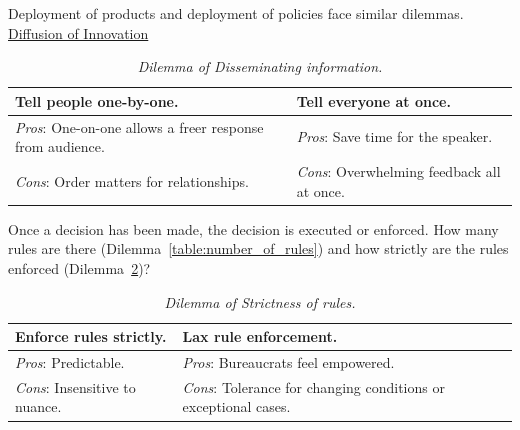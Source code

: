 Deployment of products and deployment of policies face similar dilemmas. \href{https://en.wikipedia.org/wiki/Diffusion_of_innovations}{Diffusion of Innovation}

\begin{center}
\begin{table}[H] %
\begin{tabular}{ | m{\dilemmatablewidth}| m{\dilemmatablewidth} | } 
  \hline
  \textbf{Tell people one-by-one.} & 
  \textbf{Tell everyone at once.} \\ 
  \hline
  \textit{Pros}: One-on-one allows a freer response from audience. &
  \textit{Pros}: Save time for the speaker. \\
  \hline
  \textit{Cons}: Order matters for relationships. & 
  \textit{Cons}: Overwhelming feedback all at once. \\  
  \hline
\end{tabular}
\caption{\textit{Dilemma of Disseminating information.}
}
\label{table:disseminate_one-by-one}
\end{table}
\end{center}

Once a decision has been made, the decision is executed or enforced. How many rules are there (Dilemma~\ref{table:number_of_rules}) and
how strictly are the rules enforced (Dilemma~\ref{table:rule_strictness})?

\begin{center}
\begin{table}[H] %
\begin{tabular}{ | m{\dilemmatablewidth}| m{\dilemmatablewidth} | } 
  \hline
  \textbf{Enforce rules strictly.} & 
  \textbf{Lax rule enforcement.} \\ 
  \hline
  \textit{Pros}: Predictable. &
  \textit{Pros}: Bureaucrats feel empowered. \\
  \hline
  \textit{Cons}: Insensitive to nuance. & 
  \textit{Cons}: Tolerance for changing conditions or exceptional cases.  \\  
  \hline
\end{tabular}
\caption{\textit{Dilemma of Strictness of rules.}
}
\label{table:rule_strictness}
\end{table}
\end{center}

